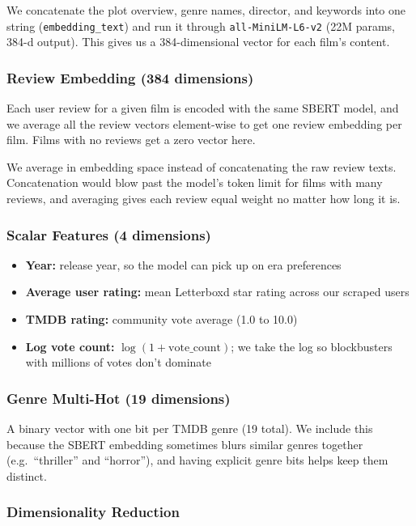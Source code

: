 \documentclass[sigconf,nonacm]{acmart}
\begin{document}
We concatenate the plot overview, genre names, director, and keywords into one string (\texttt{embedding\_text}) and run it through \texttt{all-MiniLM-L6-v2} (22M params, 384-d output). This gives us a 384-dimensional vector for each film's content.

\subsubsection{Review Embedding (384 dimensions)}

Each user review for a given film is encoded with the same SBERT model, and we average all the review vectors element-wise to get one review embedding per film. Films with no reviews get a zero vector here.

We average in embedding space instead of concatenating the raw review texts. Concatenation would blow past the model's token limit for films with many reviews, and averaging gives each review equal weight no matter how long it is.

\subsubsection{Scalar Features (4 dimensions)}

\begin{itemize}
  \item \textbf{Year:} release year, so the model can pick up on era preferences
  \item \textbf{Average user rating:} mean Letterboxd star rating across our scraped users
  \item \textbf{TMDB rating:} community vote average (1.0 to 10.0)
  \item \textbf{Log vote count:} $\log(1 + \text{vote\_count})$; we take the log so blockbusters with millions of votes don't dominate
\end{itemize}

\subsubsection{Genre Multi-Hot (19 dimensions)}

A binary vector with one bit per TMDB genre (19 total). We include this because the SBERT embedding sometimes blurs similar genres together (e.g.\ ``thriller'' and ``horror''), and having explicit genre bits helps keep them distinct.

\subsubsection{Dimensionality Reduction}
\end{document}
